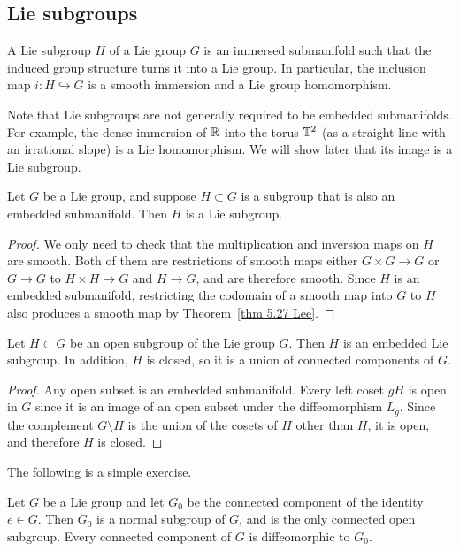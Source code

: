 \subsection{Lie subgroups}

\begin{defn}
    A Lie subgroup $H$ of a Lie group $G$ is an immersed submanifold such that the induced group structure turns it into a Lie group. In particular, the inclusion map $i:H\hookrightarrow G$ is a smooth immersion and a Lie group homomorphism.
\end{defn}

Note that Lie subgroups are not generally required to be embedded submanifolds. For example, the dense immersion of $\mathbb{R}$ into the torus $\mathbb{T}^2$ (as a straight line with an irrational slope) is a Lie homomorphism. We will show later that its image is a Lie subgroup.

\begin{prop}\label{prop 7.11 Lee}
    Let $G$ be a Lie group, and suppose $H\subset G$ is a subgroup that is also an embedded submanifold. Then $H$ is a Lie subgroup.
\end{prop}
\begin{proof}
    We only need to check that the multiplication and inversion maps on $H$ are smooth. Both of them are restrictions of smooth maps either $G\times G\to G$ or $G\to G$ to $H\times H\to G$ and $H\to G$, and are therefore smooth. Since $H$ is an embedded submanifold, restricting the codomain of a smooth map into $G$ to $H$ also produces a smooth map by Theorem~\ref{thm 5.27 Lee}.
\end{proof}

\begin{lem}\label{lem 7.12 Lee}
    Let $H\subset G$ be an open subgroup of the Lie group $G$. Then $H$ is an embedded Lie subgroup. In addition, $H$ is closed, so it is a union of connected components of $G$.
\end{lem}
\begin{proof}
    Any open subset is an embedded submanifold. Every left coset $gH$ is open in $G$ since it is an image of an open subset under the diffeomorphism $L_g$. Since the complement $G\setminus H$ is the union of the cosets of $H$ other than $H$, it is open, and therefore $H$ is closed.
\end{proof}

The following is a simple exercise.
\begin{prop}
    Let $G$ be a Lie group and let $G_0$ be the connected component of the identity $e\in G$. Then $G_0$ is a normal subgroup of $G$, and is the only connected open subgroup. Every connected component of $G$ is diffeomorphic to $G_0$.
\end{prop}

